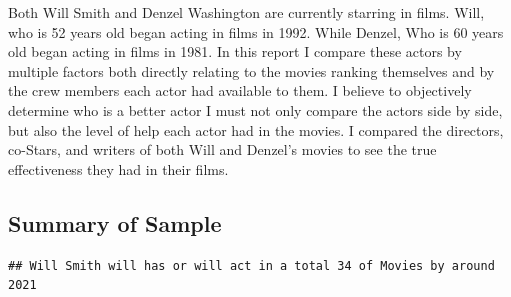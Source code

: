 \documentclass[]{article}
\begin{document}
\vspace{3mm}

\begin{figure}[!ht]
    
    \begin{center}
    \end{center}
    \label{fig:handout-1}
    
\end{figure}

\vspace{4mm}

\noindent Both Will Smith and Denzel Washington are currently starring
in films. Will, who is 52 years old began acting in films in 1992. While
Denzel, Who is 60 years old began acting in films in 1981. In this
report I compare these actors by multiple factors both directly relating
to the movies ranking themselves and by the crew members each actor had
available to them. I believe to objectively determine who is a better
actor I must not only compare the actors side by side, but also the
level of help each actor had in the movies. I compared the directors,
co-Stars, and writers of both Will and Denzel's movies to see the true
effectiveness they had in their films.

\newpage
\vspace{4mm}
\subsection{Summary of Sample}
\label{sec:data-sample}

\noindent  \vspace{10mm}

\begin{verbatim}
## Will Smith will has or will act in a total 34 of Movies by around 2021
\end{verbatim}
\end{document}
